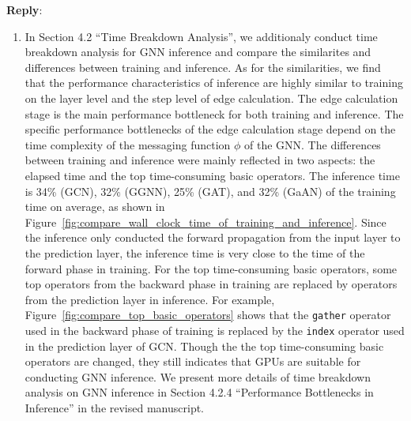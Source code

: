 \documentclass[12pt]{article}
\newenvironment{reply}
   {\medskip \noindent \textbf{Reply}:\  }
   {\medskip}
\begin{document}
\begin{reply}
\begin{enumerate}
    \item In Section 4.2 ``Time Breakdown Analysis'', we additionaly conduct time breakdown analysis for GNN inference and compare the similarites and differences between training and inference.
    As for the similarities, we find that the performance characteristics of inference are highly similar to training on the layer level and the step level of edge calculation.
    The edge calculation stage is the main performance bottleneck for both training and inference.
    The specific performance bottlenecks of the edge calculation stage depend on the time complexity of the messaging function $\phi$ of the GNN.
    The differences between training and inference were mainly reflected in two aspects: the elapsed time and the top time-consuming basic operators.
    The inference time is 34\% (GCN), 32\% (GGNN), 25\% (GAT), and 32\% (GaAN) of the training time on average, as shown in Figure~\ref{fig:compare_wall_clock_time_of_training_and_inference}.
    Since the inference only conducted the forward propagation from the input layer to the prediction layer, the inference time is very close to the time of the forward phase in training.
    For the top time-consuming basic operators, some top operators from the backward phase in training are replaced by operators from the prediction layer in inference.
    For example, Figure~\ref{fig:compare_top_basic_operators} shows that the \texttt{gather} operator used in the backward phase of training is replaced by the \texttt{index} operator used in the prediction layer of GCN.
    Though the the top time-consuming basic operators are changed, they still indicates that GPUs are suitable for conducting GNN inference.
    We present more details of time breakdown analysis on GNN inference in Section 4.2.4 ``Performance Bottlenecks in Inference'' in the revised manuscript.
        

\end{enumerate}
\end{reply}
\end{document}
